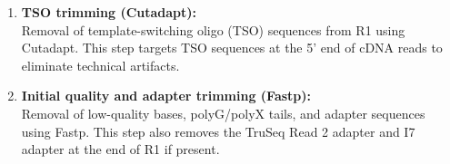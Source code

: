 \documentclass[
  11pt,
  a4paper,
]{report}
\newenvironment{Shaded}{\begin{snugshade}}{\end{snugshade}}
\newcommand{\AttributeTok}[1]{\textcolor[rgb]{0.40,0.45,0.13}{#1}}
\newcommand{\DataTypeTok}[1]{\textcolor[rgb]{0.68,0.00,0.00}{#1}}
\newcommand{\ExtensionTok}[1]{\textcolor[rgb]{0.00,0.23,0.31}{#1}}
\newcommand{\NormalTok}[1]{\textcolor[rgb]{0.00,0.23,0.31}{#1}}
\newcommand{\OperatorTok}[1]{\textcolor[rgb]{0.37,0.37,0.37}{#1}}
\newcommand{\StringTok}[1]{\textcolor[rgb]{0.13,0.47,0.30}{#1}}
\newcommand{\VariableTok}[1]{\textcolor[rgb]{0.07,0.07,0.07}{#1}}
\begin{document}
\begin{enumerate}
\def\labelenumi{\arabic{enumi}.}
\item
  \textbf{TSO trimming (Cutadapt):}\\
  Removal of template-switching oligo (TSO) sequences from R1 using
  Cutadapt. This step targets TSO sequences at the 5' end of cDNA reads
  to eliminate technical artifacts.

\begin{Shaded}
\end{Shaded}
\item
  \textbf{Initial quality and adapter trimming (Fastp):}\\
  Removal of low-quality bases, polyG/polyX tails, and adapter sequences
  using Fastp. This step also removes the TruSeq Read 2 adapter and I7
  adapter at the end of R1 if present.


\end{enumerate}
\end{document}
